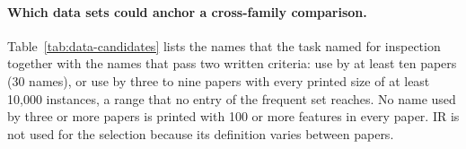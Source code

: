 
\paragraph{Which data sets could anchor a cross-family comparison.}
Table~\ref{tab:data-candidates} lists the names that the task named for
inspection together with the names that pass two written criteria: use by
at least ten papers (30 names), or use by three to nine papers with every printed size of
at least 10,000 instances, a range that no entry of the frequent set reaches.
No name used by three or more papers is printed with 100 or more features in
every paper. IR is not used for the selection because its definition varies
between papers.

